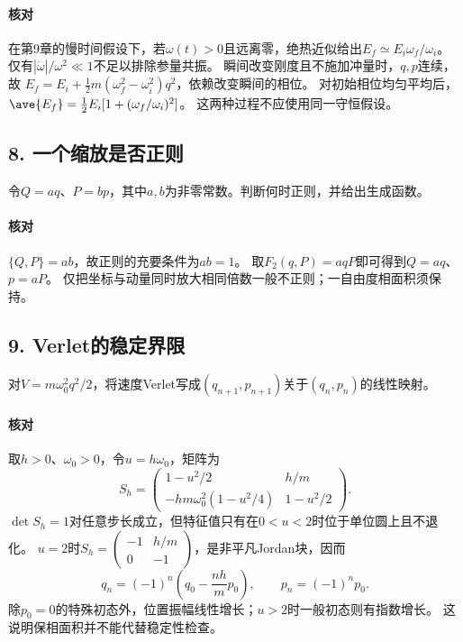 \paragraph{核对}
在第9章的慢时间假设下，若$\omega(t)>0$且远离零，绝热近似给出$E_f\simeq E_i\omega_f/\omega_i$。
仅有$|\dot\omega|/\omega^2\ll1$不足以排除参量共振。
瞬间改变刚度且不施加冲量时，$q,p$连续，故
$E_f=E_i+\tfrac12m(\omega_f^2-\omega_i^2)q^2$，依赖改变瞬间的相位。
对初始相位均匀平均后，$\ave{E_f}=\tfrac12E_i[1+(\omega_f/\omega_i)^2]$。
这两种过程不应使用同一守恒假设。

\subsection*{8. 一个缩放是否正则}
令$Q=aq$、$P=bp$，其中$a,b$为非零常数。判断何时正则，并给出生成函数。

\paragraph{核对}
$\{Q,P\}=ab$，故正则的充要条件为$ab=1$。
取$F_2(q,P)=aqP$即可得到$Q=aq$、$p=aP$。
仅把坐标与动量同时放大相同倍数一般不正则；一自由度相面积须保持。

\subsection*{9. Verlet的稳定界限}
对$V=m\omega_0^2q^2/2$，将速度Verlet写成$(q_{n+1},p_{n+1})$关于$(q_n,p_n)$的线性映射。

\paragraph{核对}
取$h>0$、$\omega_0>0$，令$u=h\omega_0$，矩阵为
\begin{equation}
 S_h=\begin{pmatrix}
 1-u^2/2 & h/m\\
 -hm\omega_0^2(1-u^2/4)&1-u^2/2
 \end{pmatrix}.
\end{equation}
$\det S_h=1$对任意步长成立，但特征值只有在$0<u<2$时位于单位圆上且不退化。
$u=2$时$S_h=\left(\begin{smallmatrix}-1&h/m\\0&-1\end{smallmatrix}\right)$，是非平凡Jordan块，因而
\[
 q_n=(-1)^n\left(q_0-\frac{nh}{m}p_0\right),\qquad p_n=(-1)^np_0.
\]
除$p_0=0$的特殊初态外，位置振幅线性增长；$u>2$时一般初态则有指数增长。
这说明保相面积并不能代替稳定性检查。
